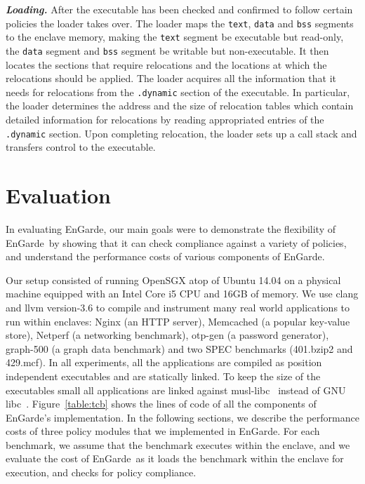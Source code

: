 \documentclass[conference,compsoc]{IEEEtran}
\newcommand{\figref}[1]{Figure~\ref{#1}}
\newcommand{\myparagraph}[1]{\parskip -4pt \indent\par\noindent\textbf{\textit{#1}} \parskip 0pt}
\newcommand{\code}[1]{{\tt \footnotesize #1}}
\newcommand{\tool}{EnGarde\xspace} %
\begin{document}
\myparagraph{Loading.} After the executable has been checked and confirmed to
follow certain policies the loader takes over. The loader maps the \code{text},
\code{data} and \code{bss} segments to the enclave memory, making the
\code{text} segment be executable but read-only, the \code{data} segment and
\code{bss} segment be writable but non-executable. It then locates the sections
that require relocations and the locations at which the relocations should be
applied. The loader acquires all the information that it needs for relocations
from the \code{.dynamic} section of the executable. In particular, the loader
determines the address and the size of relocation tables which contain detailed
information for relocations by reading appropriated entries of the
\code{.dynamic} section. Upon completing relocation, the loader sets up a call
stack and transfers control to the executable.


%

\section{Evaluation}
\label{section:evaluation}

In evaluating \tool, our main goals were to demonstrate the flexibility of
\tool\ by showing that it can check compliance against a variety of policies,
and understand the performance costs of various components of \tool.

Our setup consisted of running OpenSGX atop of Ubuntu 14.04 on a physical
machine  equipped with an Intel Core i5 CPU and 16GB of memory. We use clang
and llvm version-3.6 to compile and instrument many real world applications to
run within enclaves: Nginx (an HTTP server), Memcached (a popular key-value
store), Netperf (a networking benchmark), otp-gen (a password generator),
graph-500 (a graph data benchmark) and two SPEC benchmarks (401.bzip2 and
429.mcf). In all experiments, all the applications are compiled as position
independent executables and are statically linked. To keep the size of the
executables small all applications are linked against musl-libc~\cite{musllibc}
instead of GNU libc~\cite{gnulibc}. \figref{table:tcb} shows the lines of code
of all the components of \tool's implementation. In the following sections, we
describe the performance costs of three policy modules that we implemented in
\tool. For each benchmark, we assume that the benchmark executes within the
enclave, and we evaluate the cost of \tool\ as it loads the benchmark within
the enclave for execution, and checks for policy compliance.
\end{document}
